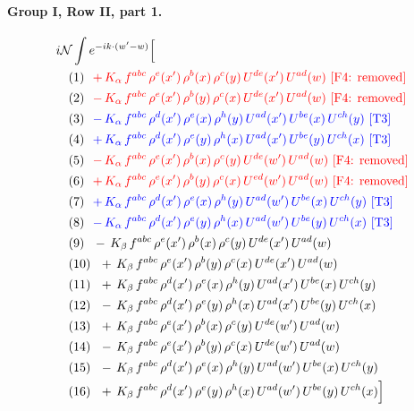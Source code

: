 \documentclass[10pt]{article}
\numberwithin{equation}{section}
\newcommand{\NN}{\mathcal N}
\begin{document}
\paragraph{Group I, Row II, part 1.}
\begin{align*}
&i\NN\int e^{-ik\cdot(w'-w)}\Big[\\
&\quad\text{(1)}\ \ \textcolor{red}{+\,K_{\alpha}\,f^{abc}\,\rho^{e}(x')\,\rho^{b}(x)\,\rho^{c}(y)\,U^{de}(x')\,U^{ad}(w)}\ \text{\textcolor{red}{[F4: removed]}}\\
&\quad\text{(2)}\ \ \textcolor{red}{-\,K_{\alpha}\,f^{abc}\,\rho^{e}(x')\,\rho^{b}(y)\,\rho^{c}(x)\,U^{de}(x')\,U^{ad}(w)}\ \text{\textcolor{red}{[F4: removed]}}\\
&\quad\text{(3)}\ \ \textcolor{blue}{-\,K_{\alpha}\,f^{abc}\,\rho^{d}(x')\,\rho^{e}(x)\,\rho^{h}(y)\,U^{ad}(x')\,U^{be}(x)\,U^{ch}(y)}\ \text{\textcolor{blue}{[T3]}}\\
&\quad\text{(4)}\ \ \textcolor{blue}{+\,K_{\alpha}\,f^{abc}\,\rho^{d}(x')\,\rho^{e}(y)\,\rho^{h}(x)\,U^{ad}(x')\,U^{be}(y)\,U^{ch}(x)}\ \text{\textcolor{blue}{[T3]}}\\
&\quad\text{(5)}\ \ \textcolor{red}{-\,K_{\alpha}\,f^{abc}\,\rho^{e}(x')\,\rho^{b}(x)\,\rho^{c}(y)\,U^{de}(w')\,U^{ad}(w)}\ \text{\textcolor{red}{[F4: removed]}}\\
&\quad\text{(6)}\ \ \textcolor{red}{+\,K_{\alpha}\,f^{abc}\,\rho^{e}(x')\,\rho^{b}(y)\,\rho^{c}(x)\,U^{ed}(w')\,U^{ad}(w)}\ \text{\textcolor{red}{[F4: removed]}}\\
&\quad\text{(7)}\ \ \textcolor{blue}{+\,K_{\alpha}\,f^{abc}\,\rho^{d}(x')\,\rho^{e}(x)\,\rho^{h}(y)\,U^{ad}(w')\,U^{be}(x)\,U^{ch}(y)}\ \text{\textcolor{blue}{[T3]}}\\
&\quad\text{(8)}\ \ \textcolor{blue}{-\,K_{\alpha}\,f^{abc}\,\rho^{d}(x')\,\rho^{e}(y)\,\rho^{h}(x)\,U^{ad}(w')\,U^{be}(y)\,U^{ch}(x)}\ \text{\textcolor{blue}{[T3]}}\\
&\quad\text{(9)}\ \ -\,K_{\beta}\,f^{abc}\,\rho^{e}(x')\,\rho^{b}(x)\,\rho^{c}(y)\,U^{de}(x')\,U^{ad}(w)\\
&\quad\text{(10)}\ \ +\,K_{\beta}\,f^{abc}\,\rho^{e}(x')\,\rho^{b}(y)\,\rho^{c}(x)\,U^{de}(x')\,U^{ad}(w)\\
&\quad\text{(11)}\ \ +\,K_{\beta}\,f^{abc}\,\rho^{d}(x')\,\rho^{e}(x)\,\rho^{h}(y)\,U^{ad}(x')\,U^{be}(x)\,U^{ch}(y)\\
&\quad\text{(12)}\ \ -\,K_{\beta}\,f^{abc}\,\rho^{d}(x')\,\rho^{e}(y)\,\rho^{h}(x)\,U^{ad}(x')\,U^{be}(y)\,U^{ch}(x)\\
&\quad\text{(13)}\ \ +\,K_{\beta}\,f^{abc}\,\rho^{e}(x')\,\rho^{b}(x)\,\rho^{c}(y)\,U^{de}(w')\,U^{ad}(w)\\
&\quad\text{(14)}\ \ -\,K_{\beta}\,f^{abc}\,\rho^{e}(x')\,\rho^{b}(y)\,\rho^{c}(x)\,U^{de}(w')\,U^{ad}(w)\\
&\quad\text{(15)}\ \ -\,K_{\beta}\,f^{abc}\,\rho^{d}(x')\,\rho^{e}(x)\,\rho^{h}(y)\,U^{ad}(w')\,U^{be}(x)\,U^{ch}(y)\\
&\quad\text{(16)}\ \ +\,K_{\beta}\,f^{abc}\,\rho^{d}(x')\,\rho^{e}(y)\,\rho^{h}(x)\,U^{ad}(w')\,U^{be}(y)\,U^{ch}(x)\Big]
\end{align*}
\end{document}
